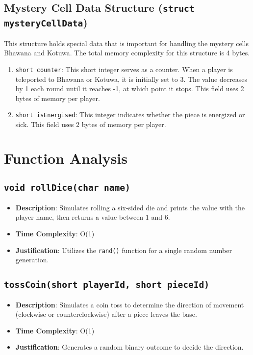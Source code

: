 \documentclass{article}
\begin{document}
\subsection{Mystery Cell Data Structure (\texttt{struct mysteryCellData})}
This structure holds special data that is important for handling the mystery cells Bhawana and Kotuwa. The total memory complexity for this structure is 4 bytes.

\begin{enumerate}
    \item \texttt{short counter}: This short integer serves as a counter. When a player is teleported to Bhawana or Kotuwa, it is initially set to 3. The value decreases by 1 each round until it reaches -1, at which point it stops. This field uses 2 bytes of memory per player.
    \item \texttt{short isEnergised}: This integer indicates whether the piece is energized or sick. This field uses 2 bytes of memory per player.
\end{enumerate}

\section{Function Analysis}

\subsection{\texttt{void rollDice(char name)}}
\begin{itemize}
    \item \textbf{Description}: Simulates rolling a six-sided die and prints the value with the player name, then returns a value between 1 and 6.
    \item \textbf{Time Complexity}: O(1)
    \item \textbf{Justification}: Utilizes the \texttt{rand()} function for a single random number generation.
\end{itemize}

\subsection{\texttt{tossCoin(short playerId, short pieceId)}}
\begin{itemize}
    \item \textbf{Description}: Simulates a coin toss to determine the direction of movement (clockwise or counterclockwise) after a piece leaves the base.
    \item \textbf{Time Complexity}: O(1)
    \item \textbf{Justification}: Generates a random binary outcome to decide the direction.
\end{itemize}
\end{document}
